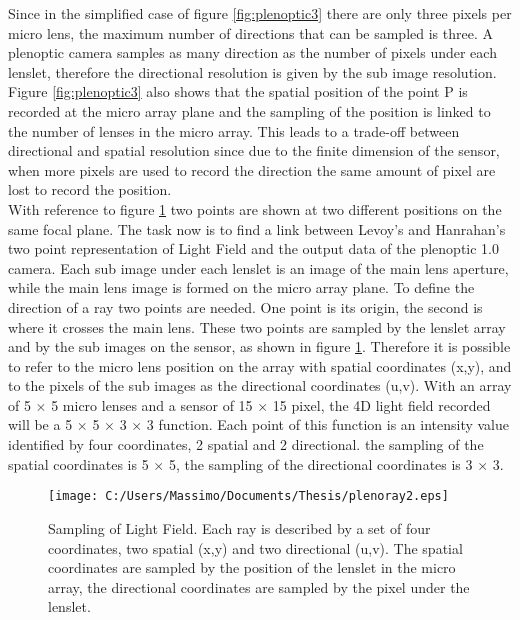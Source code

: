 Since in the simplified case of figure \ref{fig:plenoptic3} there are only three pixels per micro lens, the maximum number of directions that can be sampled is three. A plenoptic camera samples as many direction as the number of pixels under each lenslet, therefore the directional resolution is given by the sub image resolution. Figure \ref{fig:plenoptic3} also shows that the spatial position of the point P is recorded at the micro array plane and the sampling of the position is linked to the number of lenses in the micro array. This leads to a trade-off between directional and spatial resolution since due to the finite dimension of the sensor, when more pixels are used to record the direction the same amount of pixel are lost to record the position. \\
With reference to figure \ref{fig:plenoptic4} two points are shown at two different positions on the same focal plane. The task now is to find a link between Levoy's and Hanrahan's two point representation of Light Field \cite{levoy1996light,levoy2006microscope} and the output data of the plenoptic 1.0 camera. Each sub image under each lenslet is an image of the main lens aperture, while the main lens image is formed on the micro array plane. To define the direction of a ray two points are needed. One point is its origin, the second is where it crosses the main lens. These two points are sampled by the lenslet array and by the sub images on the sensor, as shown in figure \ref{fig:plenoptic4}. Therefore it is possible to refer to the micro lens position on the array with spatial coordinates (x,y), and to the pixels of the sub images as the directional coordinates (u,v). With an array of 5 $\times$ 5 micro lenses and a sensor of 15 $\times$ 15 pixel, the 4D light field recorded will be a 5 $\times$ 5 $\times$ 3 $\times$ 3 function. Each point of this function is an intensity value identified by four coordinates, 2 spatial and 2 directional. the sampling of the spatial coordinates is 5 $\times$ 5, the sampling of the directional coordinates is 3 $\times$ 3. 
\begin{figure}[H]
	\centering
	\texttt{[image: C:/Users/Massimo/Documents/Thesis/plenoray2.eps]}
	\caption{\label{fig:plenoptic4} Sampling of Light Field. Each ray is described by a set of four coordinates, two spatial (x,y) and two directional (u,v). The spatial coordinates are sampled by the position of the lenslet in the micro array, the directional coordinates are sampled by the pixel under the lenslet.}
\end{figure}

